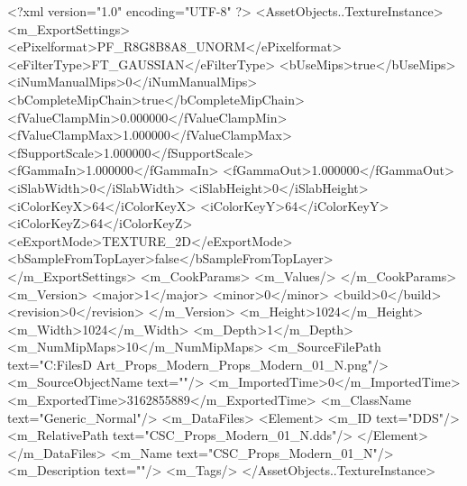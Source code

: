 <?xml version="1.0" encoding="UTF-8" ?>
<AssetObjects..TextureInstance>
	<m_ExportSettings>
		<ePixelformat>PF_R8G8B8A8_UNORM</ePixelformat>
		<eFilterType>FT_GAUSSIAN</eFilterType>
		<bUseMips>true</bUseMips>
		<iNumManualMips>0</iNumManualMips>
		<bCompleteMipChain>true</bCompleteMipChain>
		<fValueClampMin>0.000000</fValueClampMin>
		<fValueClampMax>1.000000</fValueClampMax>
		<fSupportScale>1.000000</fSupportScale>
		<fGammaIn>1.000000</fGammaIn>
		<fGammaOut>1.000000</fGammaOut>
		<iSlabWidth>0</iSlabWidth>
		<iSlabHeight>0</iSlabHeight>
		<iColorKeyX>64</iColorKeyX>
		<iColorKeyY>64</iColorKeyY>
		<iColorKeyZ>64</iColorKeyZ>
		<eExportMode>TEXTURE_2D</eExportMode>
		<bSampleFromTopLayer>false</bSampleFromTopLayer>
	</m_ExportSettings>
	<m_CookParams>
		<m_Values/>
	</m_CookParams>
	<m_Version>
		<major>1</major>
		<minor>0</minor>
		<build>0</build>
		<revision>0</revision>
	</m_Version>
	<m_Height>1024</m_Height>
	<m_Width>1024</m_Width>
	<m_Depth>1</m_Depth>
	<m_NumMipMaps>10</m_NumMipMaps>
	<m_SourceFilePath text="C:\Users\Shadow\Desktop\Working Files\3D Art\Textures\CSC_Props_Modern\Current\textures\CSC_Props_Modern_01_N.png"/>
	<m_SourceObjectName text=""/>
	<m_ImportedTime>0</m_ImportedTime>
	<m_ExportedTime>3162855889</m_ExportedTime>
	<m_ClassName text="Generic_Normal"/>
	<m_DataFiles>
		<Element>
			<m_ID text="DDS"/>
			<m_RelativePath text="CSC_Props_Modern_01_N.dds"/>
		</Element>
	</m_DataFiles>
	<m_Name text="CSC_Props_Modern_01_N"/>
	<m_Description text=""/>
	<m_Tags/>
</AssetObjects..TextureInstance>

